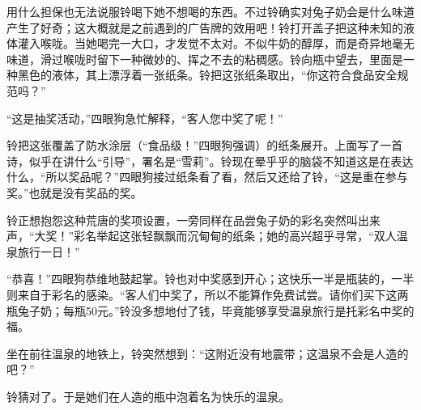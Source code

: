用什么担保也无法说服铃喝下她不想喝的东西。不过铃确实对兔子奶会是什么味道产生了好奇；这大概就是之前遇到的广告牌的效用吧！铃打开盖子把这种未知的液体灌入喉咙。当她喝完一大口，才发觉不太对。不似牛奶的醇厚，而是奇异地毫无味道，滑过喉咙时留下一种微妙的、挥之不去的粘稠感。铃向瓶中望去，里面是一种黑色的液体，其上漂浮着一张纸条。铃把这张纸条取出，“你这符合食品安全规范吗？”

“这是抽奖活动，”四眼狗急忙解释，“客人您中奖了呢！”

铃把这张覆盖了防水涂层（“食品级！”四眼狗强调）的纸条展开。上面写了一首诗，似乎在讲什么“引导”，署名是“雪莉”。铃现在晕乎乎的脑袋不知道这是在表达什么，“所以奖品呢？”四眼狗接过纸条看了看，然后又还给了铃，“这是重在参与奖。”也就是没有奖品的奖。

铃正想抱怨这种荒唐的奖项设置，一旁同样在品尝兔子奶的彩名突然叫出来声，“大奖！”彩名举起这张轻飘飘而沉甸甸的纸条；她的高兴超乎寻常，“双人温泉旅行一日！”

“恭喜！”四眼狗恭维地鼓起掌。铃也对中奖感到开心；这快乐一半是瓶装的，一半则来自于彩名的感染。“客人们中奖了，所以不能算作免费试尝。请你们买下这两瓶兔子奶；每瓶50元。”铃没多想地付了钱，毕竟能够享受温泉旅行是托彩名中奖的福。

坐在前往温泉的地铁上，铃突然想到：“这附近没有地震带；这温泉不会是人造的吧？”

铃猜对了。于是她们在人造的瓶中泡着名为快乐的温泉。
